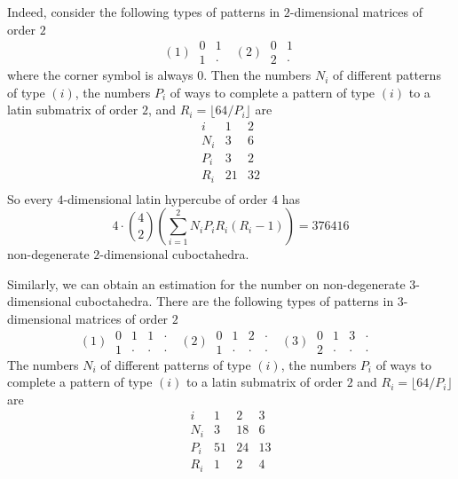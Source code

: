 \documentclass[a4paper]{article}
\begin{document}
Indeed,  consider the  following types of patterns in $2$-dimensional matrices of order $2$ 
$$
(1) ~\begin{array}{cc}
0 & 1 \\ 1 & \cdot
\end{array} ~~~
(2) ~ \begin{array}{cc}
0 & 1 \\ 2 & \cdot
\end{array}
$$
 where the corner symbol is always $0$. Then the numbers   $N_i$ of  different patterns of type $(i)$,   the numbers $P_i$  of ways to complete a pattern of type   $(i)$ to a latin  submatrix of order $2$,  and   $R_i = \lfloor 64  / P_i  \rfloor$ are
$$
\begin{array}{c||c|c}
i & 1 & 2 \\
\hline
N_i & 3  & 6  \\
P_i & 3  & 2 \\
R_i & 21 &  32 \\
\end{array}
$$
So every $4$-dimensional latin hypercube of order $4$ has 
$$  4 \cdot  {4 \choose 2}  \left( \sum\limits_{i=1}^2 N_i P_i R_i(R_i - 1)  \right)   = 376416 $$  
non-degenerate $2$-dimensional cuboctahedra. 

Similarly, we can obtain an estimation for the number on non-degenerate $3$-dimensional cuboctahedra.
There are the following types of patterns in $3$-dimensional matrices of order $2$ 
$$
(1) ~\begin{array}{cc|cc}
0 & 1 & 1 & \cdot \\ 1 & \cdot & \cdot & \cdot
\end{array} ~~~
(2) ~\begin{array}{cc|cc}
0 & 1 & 2 & \cdot \\ 1 & \cdot & \cdot & \cdot
\end{array} ~~~
(3) ~\begin{array}{cc|cc}
0 & 1 & 3 & \cdot \\ 2 & \cdot & \cdot & \cdot
\end{array} ~~~
$$
The numbers $N_i$ of  different patterns of type $(i)$,   the numbers $P_i$  of ways to complete a pattern of type   $(i)$ to a latin submatrix of order $2$  and   $R_i = \lfloor 64  / P_i  \rfloor$ are
$$
\begin{array}{c||c|c|c}
i & 1 & 2 & 3 \\
\hline
N_i & 3  & 18 &  6  \\
P_i & 51  & 24  & 13  \\
R_i & 1 &  2 & 4  \\
\end{array}
$$
\end{document}
